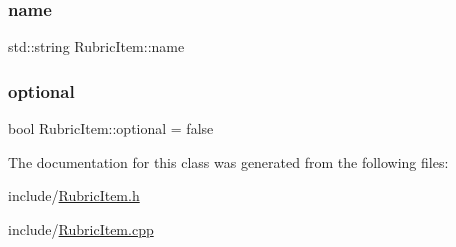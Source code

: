 \hypertarget{class_rubric_item_accc3649acf6ae1bb543b56d826a3d01f}{}\label{class_rubric_item_accc3649acf6ae1bb543b56d826a3d01f} 
\subsubsection{\texorpdfstring{name}{name}}
{\footnotesize\ttfamily std\+::string Rubric\+Item\+::name}

\hypertarget{class_rubric_item_aebc5a7d15f0c2f5addc66fdb854693c0}{}\label{class_rubric_item_aebc5a7d15f0c2f5addc66fdb854693c0} 
\subsubsection{\texorpdfstring{optional}{optional}}
{\footnotesize\ttfamily bool Rubric\+Item\+::optional = false}



The documentation for this class was generated from the following files\+:\begin{DoxyCompactItemize}
\item 
include/\hyperlink{_rubric_item_8h}{Rubric\+Item.\+h}\item 
include/\hyperlink{_rubric_item_8cpp}{Rubric\+Item.\+cpp}\end{DoxyCompactItemize}
